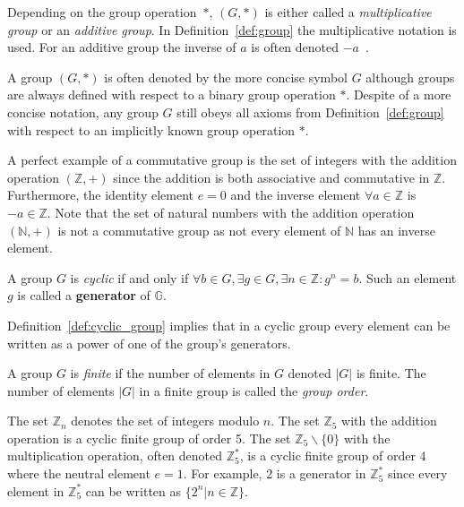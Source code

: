 Depending on the group operation~$*$, $\left( G, * \right)$ is either called a \textit{multiplicative group} or an \textit{additive group}. In Definition~\ref{def:group} the multiplicative notation is used. For an additive group  the inverse of $a$ is often denoted $- a$~\cite{book:handbook_of_applied_cryptography}. 

A group $\left( G, * \right)$ is often denoted by the more concise symbol $G$ although groups are always defined with respect to a binary group operation $*$. Despite of a more concise notation, any group $G$ still obeys all axioms from Definition~\ref{def:group} with respect to an implicitly known group operation $*$.

A perfect example of a commutative group is the set of integers with the addition operation $\left( \mathbb{Z}, + \right)$ since the addition is both associative and commutative in $\mathbb{Z}$. Furthermore, the identity element $e = 0$ and the inverse element $\forall a \in \mathbb{Z}$ is $-a \in \mathbb{Z}$. Note that the set of natural numbers with the addition operation $\left( \mathbb{N}, + \right)$ is not a commutative group as not every element of $\mathbb{N}$ has an inverse element.

\begin{defn}
\label{def:cyclic_group}
 A group $G$ is \textit{cyclic} if and only if $\forall b \in G, \exists g \in G,\exists n \in \mathbb{Z}: g^n = b$. Such an element $g$ is called a \textbf{generator} of $\mathbb{G}$.
\end{defn}

Definition~\ref{def:cyclic_group} implies that in a cyclic group every element can be written as a power of one of the group's generators.

\begin{defn}
\label{def:finite_group}
 A group $G$ is \textit{finite} if the number of elements in $G$ denoted $|G|$ is finite. The number of elements $|G|$ in a finite group is called the \textit{group order}.
\end{defn}

The set $\mathbb{Z}_n$ denotes the set of integers modulo $n$. The set $\mathbb{Z}_5$ with the addition operation is a cyclic finite group of order 5. The set $\mathbb{Z}_5 \backslash \{0\}$ with the multiplication operation, often denoted $\mathbb{Z}^{*}_5$, is a cyclic finite group of order 4 where the neutral element $e=1$. For example, 2 is a generator in $\mathbb{Z}^{*}_5$ since every element in $\mathbb{Z}^{*}_5$ can be written as $\{ 2^n | n \in \mathbb{Z} \}$.

